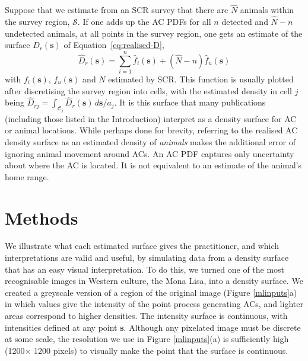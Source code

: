 \documentclass[useAMS,usenatbib,referee]{biom}
\begin{document}
Suppose that we estimate from an SCR survey that there are $\hat{N}$ animals within the survey region, $\mathcal{S}$. If one adds up the AC PDFs for all $n$ detected and $\hat{N}-n$ undetected animals, at all points in the survey region, one gets an estimate of the surface $D_r(\bm{s})$ of Equation~\eqref{eq:realised-D},
\begin{equation}
\widehat{D}_r(\bm{s}) = \sum_{i = 1}^n \hat{f}_i(\bm{s}) + (\widehat{N} - n)\hat{f}_u(\bm{s})
\end{equation}
with $f_i(\bm{s})$, $f_u(\bm{s})$ and $N$ estimated by SCR. This function is usually plotted after discretising the survey region into cells, with the estimated density in cell $j$ being $\widehat{D}_{rj}=\int_{\mathcal{C}_j}\widehat{D}_r(\bm{s})\, d\bm{s}/a_j$. It is this surface that many publications (including those listed in the Introduction) interpret as a density surface for AC or animal locations. While perhaps done for brevity, referring to the realised AC density surface as an estimated density of {\it animals} makes the additional error of ignoring animal movement around ACs. An AC PDF captures only uncertainty about where the AC is located. It is not equivalent to an estimate of the animal's home range. 


\section{Methods}

We illustrate what each estimated surface gives the practitioner, and which interpretations are valid and useful, by simulating data from a density surface that has an easy visual interpretation. To do this, we turned one of the most recognisable images in Western culture, the Mona Lisa, into a density surface. We created a greyscale version of a region of the original image (Figure \ref{mlinputs}a) in which values give the intensity of the point process generating ACs, and lighter areas correspond to higher densities. The intensity surface is continuous, with intensities defined at any point $\bm{s}$. Although any pixelated image must be discrete at some scale, the resolution we use in Figure \ref{mlinputs}(a) is sufficiently high (1200$\times$ 1200 pixels) to visually make the point that the surface is continuous.  
\end{document}
